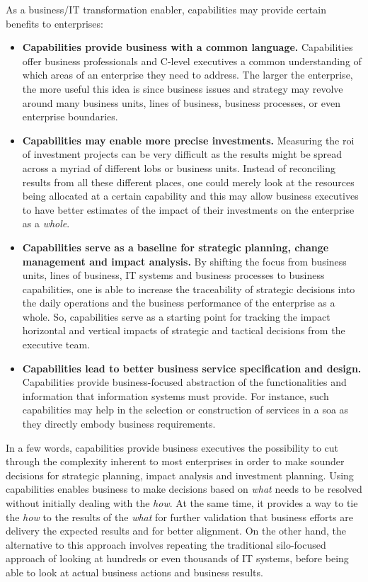 %
%
As a business/IT transformation enabler, capabilities may provide certain benefits to enterprises:

\begin{itemize}
    \item \textbf{Capabilities provide business with a common language.}
          Capabilities offer business professionals and C-level executives a common understanding of which areas of an
          enterprise they need to address.
          The larger the enterprise, the more useful this idea is since business issues and strategy may revolve
          around many business units, lines of business, business processes, or even enterprise boundaries.
    \item \textbf{Capabilities may enable more precise investments.}
          Measuring the \gls{roi} of investment projects can be very difficult as the results might be spread across a
          myriad of different \glspl{lob} or business units.
          Instead of reconciling results from all these different places,
          one could merely look at the resources being allocated at a certain capability and this may allow
          business executives to have better estimates of the impact of their investments on the
          enterprise as a \textit{whole}.
    \item \textbf{Capabilities serve as a baseline for strategic planning, change management and impact analysis.}
          By shifting the focus from business units, lines of business, IT systems and business processes
          to business capabilities, one is able to increase the traceability of strategic decisions into the
          daily operations and the business performance of the enterprise as a whole.
          So, capabilities serve as a starting point for tracking the impact horizontal and vertical
          impacts of strategic and tactical decisions from the executive team.
    \item \textbf{Capabilities lead to better business service specification and design.}
          Capabilities provide business-focused abstraction of the functionalities and information that
          information systems must provide.
          For instance, such capabilities may help in the selection or construction of services in a
          \gls{soa} as they directly embody business requirements.
\end{itemize}

In a few words, capabilities provide business executives the possibility to cut through the complexity inherent
to most enterprises in order to make sounder decisions for strategic planning, impact analysis and investment planning.
Using capabilities enables business to make decisions based on \textit{what} needs to be resolved without initially
dealing with the \textit{how}.
At the same time, it provides a way to tie the \textit{how} to the results of the \textit{what}
for further validation that business efforts are delivery the expected results and for better alignment.
On the other hand, the alternative to this approach involves repeating the traditional silo-focused approach of
looking at hundreds or even thousands of IT systems,
before being able to look at actual business actions and business results.